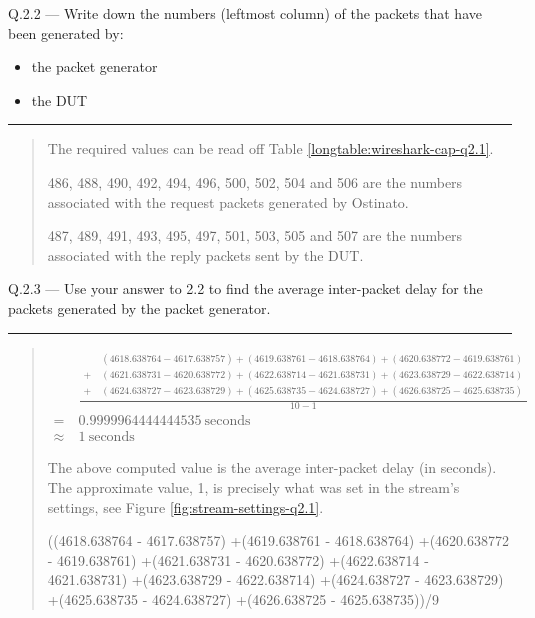 \documentclass{article}
\newcommand\Que[2]{%
   \begin{samepage}
   \leavevmode\par
   \noindent
   Q.#1 --- #2\par\vspace{10pt}\hrule\vspace{10pt}
   \end{samepage}}
\newenvironment{ans}
   {\fbox{Answer}\begin{quote}\nopagebreak}
   {\end{quote}}
\begin{document}
\newpage

\Que{2.2}{Write down the numbers (leftmost column) of the packets that have been generated by:
\begin{itemize}
\item the packet generator
\item the DUT
\end{itemize}
}

\begin{ans}
The required values can be read off Table
\ref{longtable:wireshark-cap-q2.1}.

486, 488, 490, 492, 494, 496, 500, 502, 504 and 506 are the
numbers associated with the request packets generated by
Ostinato.

487, 489, 491, 493, 495, 497, 501, 503, 505 and 507 are the
numbers associated with the reply packets sent by the DUT.
\end{ans}

\Que{2.3}{Use your answer to 2.2 to find the average
inter-packet delay for the packets generated by the packet
generator.}
\begin{ans}

$$
\begin{aligned}
          & \frac{
\begin{aligned}
    & (4618.638764 - 4617.638757)
+(4619.638761 - 4618.638764)
+(4620.638772 - 4619.638761)      \\
+\  & (4621.638731 - 4620.638772)
+(4622.638714 - 4621.638731)
+(4623.638729 - 4622.638714)      \\
+\  & (4624.638727 - 4623.638729)
+(4625.638735 - 4624.638727)
+(4626.638725 - 4625.638735)
\end{aligned}
}{10 - 1}                                      \\
=\        & 0.9999964444444535\ \text{seconds} \\
\approx\  & 1\ \text{seconds}
\end{aligned}
$$

The above computed value is the average inter-packet delay
(in seconds). The approximate value, 1, is precisely what
was set in the stream's settings, see Figure
\ref{fig:stream-settings-q2.1}.

\begin{gruvboxlisting}[language=Python, caption={Python
expression for calculating the inter-packet delay for
Question 2.3.}]
((4618.638764 - 4617.638757)
+(4619.638761 - 4618.638764)
+(4620.638772 - 4619.638761)
+(4621.638731 - 4620.638772)
+(4622.638714 - 4621.638731)
+(4623.638729 - 4622.638714)
+(4624.638727 - 4623.638729)
+(4625.638735 - 4624.638727)
+(4626.638725 - 4625.638735))/9
\end{gruvboxlisting}

\end{ans}
\end{document}

